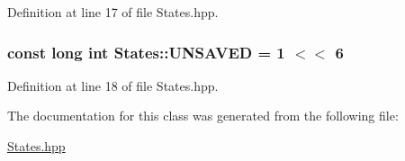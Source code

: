 Definition at line 17 of file States.\+hpp.

\hypertarget{class_states_ab21454aabe0d13104295c53fec620e73}{
\subsubsection[{U\+N\+S\+A\+V\+E\+D}]{\setlength{\rightskip}{0pt plus 5cm}const long int States\+::\+U\+N\+S\+A\+V\+E\+D = 1 $<$$<$ 6\hspace{0.3cm}{\ttfamily [static]}}}\label{class_states_ab21454aabe0d13104295c53fec620e73}


Definition at line 18 of file States.\+hpp.



The documentation for this class was generated from the following file\+:\begin{DoxyCompactItemize}
\item 
\hyperlink{_states_8hpp}{States.\+hpp}\end{DoxyCompactItemize}
